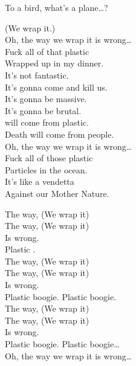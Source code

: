 To a bird, what's a plane…? \\





(We wrap it.) \\

Oh, the way we wrap it is wrong… \\

Fuck all of that plastic \\
Wrapped up in my dinner. \\
It's not fantastic. \\
It's gonna come and kill us. \\
It's gonna be massive. \\
It's gonna be brutal. \\
 will come from plastic. \\
Death will come from people. \\

Oh, the way we wrap it is wrong… \\

Fuck all of those plastic \\
Particles in the ocean. \\
It's like a vendetta \\
Against our Mother Nature.

The way, (We wrap it) \\
The way, (We wrap it) \\
Is wrong. \\
Plastic . \\

The way, (We wrap it) \\
The way, (We wrap it) \\
Is wrong. \\
Plastic boogie. Plastic boogie. \\

The way, (We wrap it) \\
The way, (We wrap it) \\
Is wrong. \\
Plastic boogie. Plastic boogie… \\

Oh, the way we wrap it is wrong… \\

